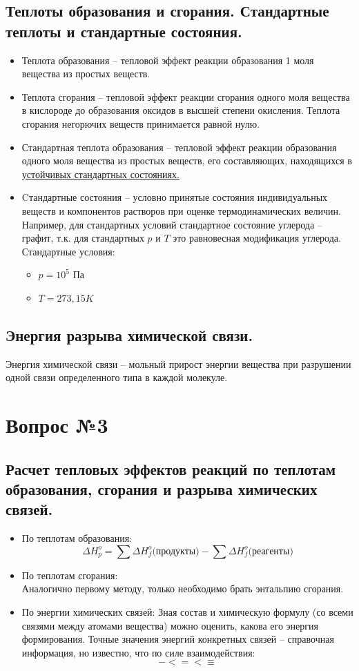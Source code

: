 \documentclass[14pt,a4paper]{scrartcl}
\begin{document}
	\subsection*{Теплоты образования и сгорания. Стандартные теплоты и стандартные состояния.}
	\begin{itemize}
		\item Теплота образования -- тепловой эффект реакции образования 1 моля вещества из простых веществ.
		\item Теплота сгорания -- тепловой эффект реакции сгорания одного моля вещества в кислороде до образования оксидов в высшей степени окисления. Теплота сгорания негорючих веществ принимается равной нулю.
		\item Стандартная теплота образования -- тепловой эффект реакции образования одного моля вещества из простых веществ, его составляющих, находящихся в \underline{устойчивых стандартных состояниях.}
		\item Cтандартные состояния -- условно принятые состояния индивидуальных веществ и компонентов растворов при оценке термодинамических величин.  
		Например, для стандартных условий стандартное состояние углерода -- графит, т.к. для стандартных $p$ и $T$ это равновесная модификация углерода.
		Стандартные условия:
		\begin{itemize}
			\item $p = 10^5$ Па
			\item $T = 273,15 K$
		\end{itemize}
	\end{itemize}
	\subsection*{Энергия разрыва химической связи.}
	Энергия химической связи -- мольный прирост энергии вещества при разрушении одной связи определенного типа в каждой молекуле.			


\section*{Вопрос №3}	

		\subsection*{Расчет тепловых эффектов реакций по теплотам образования, сгорания и разрыва химических связей.}
		\begin{itemize}
			\item По теплотам образования: 
			$$\Delta{H_{p}^{o}} = \sum \Delta{H_{f}^o} \text{(продукты)} - \sum \Delta{H_{f}^o} \text{(реагенты)}  $$
			\item По теплотам сгорания: \\
			Аналогично первому методу, только необходимо брать энтальпию сгорания.
			\item По энергии химических связей:
			Зная состав и химическую формулу (со всеми связями между атомами вещества) можно оценить, какова его энергия формирования. Точные значения энергий конкретных связей -- справочная информация, но известно, что по силе взаимодействия:
			$$ -  <  =  <  \equiv $$
		\end{itemize}
\end{document}
